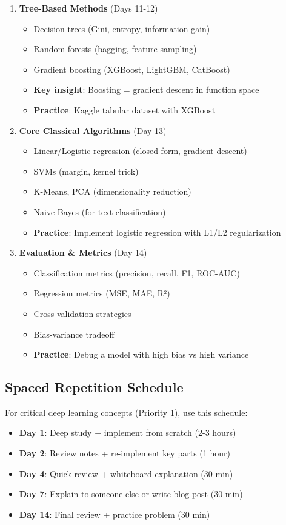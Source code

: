 \documentclass[10pt]{article}
\begin{document}
\begin{enumerate}
\item \textbf{Tree-Based Methods} (Days 11-12)
\begin{itemize}
\item Decision trees (Gini, entropy, information gain)
\item Random forests (bagging, feature sampling)
\item Gradient boosting (XGBoost, LightGBM, CatBoost)
\item \textbf{Key insight}: Boosting = gradient descent in function space
\item \textbf{Practice}: Kaggle tabular dataset with XGBoost
\end{itemize}

\item \textbf{Core Classical Algorithms} (Day 13)
\begin{itemize}
\item Linear/Logistic regression (closed form, gradient descent)
\item SVMs (margin, kernel trick)
\item K-Means, PCA (dimensionality reduction)
\item Naive Bayes (for text classification)
\item \textbf{Practice}: Implement logistic regression with L1/L2 regularization
\end{itemize}

\item \textbf{Evaluation \& Metrics} (Day 14)
\begin{itemize}
\item Classification metrics (precision, recall, F1, ROC-AUC)
\item Regression metrics (MSE, MAE, R²)
\item Cross-validation strategies
\item Bias-variance tradeoff
\item \textbf{Practice}: Debug a model with high bias vs high variance
\end{itemize}
\end{enumerate}

\subsection{Spaced Repetition Schedule}

For critical deep learning concepts (Priority 1), use this schedule:
\begin{itemize}
\item \textbf{Day 1}: Deep study + implement from scratch (2-3 hours)
\item \textbf{Day 2}: Review notes + re-implement key parts (1 hour)
\item \textbf{Day 4}: Quick review + whiteboard explanation (30 min)
\item \textbf{Day 7}: Explain to someone else or write blog post (30 min)
\item \textbf{Day 14}: Final review + practice problem (30 min)
\end{itemize}
\end{document}
